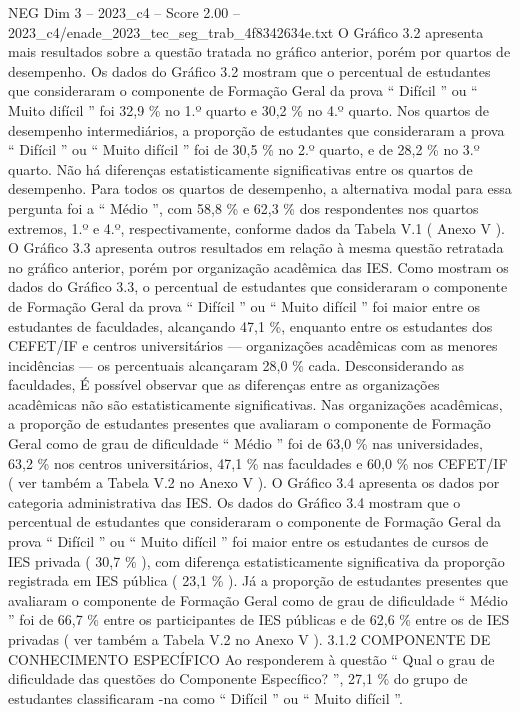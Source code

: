 \begin{textsample}{NEG Dim 3 – 2023\_c4 – Score 2.00 – 2023\_c4/enade\_2023\_tec\_seg\_trab\_4f8342634e.txt}
O Gráfico 3.2 apresenta mais resultados sobre a questão tratada no gráfico anterior, porém por quartos de desempenho.
Os dados do Gráfico 3.2 mostram que o percentual de estudantes que consideraram o componente de Formação Geral da prova “ Difícil ” ou “ Muito difícil ” foi 32,9 \% no 1.º quarto e 30,2 \% no 4.º quarto.
Nos quartos de desempenho intermediários, a proporção de estudantes que consideraram a prova “ Difícil ” ou “ Muito difícil ” foi de 30,5 \% no 2.º quarto, e de 28,2 \% no 3.º quarto.
Não há diferenças estatisticamente significativas entre os quartos de desempenho.
Para todos os quartos de desempenho, a alternativa modal para essa pergunta foi a “ Médio ”, com 58,8 \% e 62,3 \% dos respondentes nos quartos extremos, 1.º e 4.º, respectivamente, conforme dados da Tabela V.1 ( Anexo V ).
O Gráfico 3.3 apresenta outros resultados em relação à mesma questão retratada no gráfico anterior, porém por organização acadêmica das IES.
Como mostram os dados do Gráfico 3.3, o percentual de estudantes que consideraram o componente de Formação Geral da prova “ Difícil ” ou “ Muito difícil ” foi maior entre os estudantes de faculdades, alcançando 47,1 \%, enquanto entre os estudantes dos CEFET/IF e centros universitários — organizações acadêmicas com as menores incidências — os percentuais alcançaram 28,0 \% cada.
Desconsiderando as faculdades, É possível observar que as diferenças entre as organizações acadêmicas não são estatisticamente significativas.
Nas organizações acadêmicas, a proporção de estudantes presentes que avaliaram o componente de Formação Geral como de grau de dificuldade “ Médio ” foi de 63,0 \% nas universidades, 63,2 \% nos centros universitários, 47,1 \% nas faculdades e 60,0 \% nos CEFET/IF ( ver também a Tabela V.2 no Anexo V ).
O Gráfico 3.4 apresenta os dados por categoria administrativa das IES.
Os dados do Gráfico 3.4 mostram que o percentual de estudantes que consideraram o componente de Formação Geral da prova “ Difícil ” ou “ Muito difícil ” foi maior entre os estudantes de cursos de IES privada ( 30,7 \% ), com diferença estatisticamente significativa da proporção registrada em IES pública ( 23,1 \% ).
Já a proporção de estudantes presentes que avaliaram o componente de Formação Geral como de grau de dificuldade “ Médio ” foi de 66,7 \% entre os participantes de IES públicas e de 62,6 \% entre os de IES privadas ( ver também a Tabela V.2 no Anexo V ). 3.1.2 COMPONENTE DE CONHECIMENTO ESPECÍFICO Ao responderem à questão “ Qual o grau de dificuldade das questões do Componente Específico? ”, 27,1 \% do grupo de estudantes classificaram -na como “ Difícil ” ou “ Muito difícil ”.

\end{textsample}
